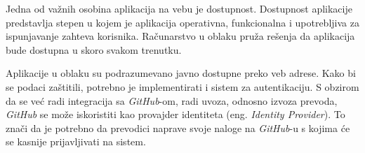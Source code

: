 Jedna od važnih osobina aplikacija na vebu je dostupnost. Dostupnost aplikacije predstavlja stepen u kojem je 
aplikacija operativna, funkcionalna i upotrebljiva za ispunjavanje zahteva korisnika. 
Računarstvo u oblaku pruža rešenja da aplikacija bude dostupna u skoro svakom trenutku.

Aplikacije u oblaku su podrazumevano javno dostupne preko veb adrese. Kako bi se podaci zaštitili,
potrebno je implementirati i sistem za autentikaciju. S obzirom da se već radi integracija sa \textit{GitHub}-om, radi
uvoza, odnosno izvoza prevoda, \textit{GitHub} se može iskoristiti kao provajder identiteta (eng. \textit{Identity Provider}).
To znači da je potrebno da prevodici naprave svoje naloge na \textit{GitHub}-u s kojima će se kasnije prijavljivati 
na sistem.